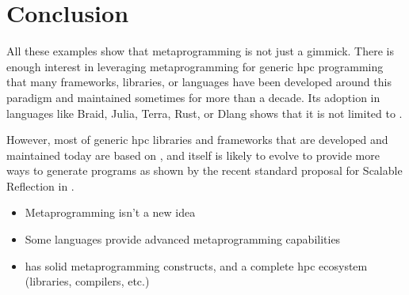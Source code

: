 \documentclass[../main]{subfiles}
\begin{document}
\section{
  Conclusion
}

All these examples show that metaprogramming is not just a gimmick.
There is enough interest in leveraging metaprogramming
for generic \gls{hpc} programming that many frameworks, libraries, or languages
have been developed around this paradigm and maintained sometimes
for more than a decade. Its adoption in languages like Braid, Julia, Terra,
Rust, or Dlang shows that it is not limited to \cpp.

However, most of generic \gls{hpc} libraries and frameworks that are developed
and maintained today are based on \cpp, and \cpp itself is likely to
evolve to provide more ways to generate programs as shown by the recent
standard proposal for Scalable Reflection in \cpp \cite{scalable-reflection}.

\begin{itemize}
\item Metaprogramming isn't a new idea

\item Some languages provide advanced metaprogramming capabilities

\item \cpp has solid metaprogramming constructs, and a complete \gls{hpc} ecosystem
(libraries, compilers, etc.)
\end{itemize}
\end{document}
